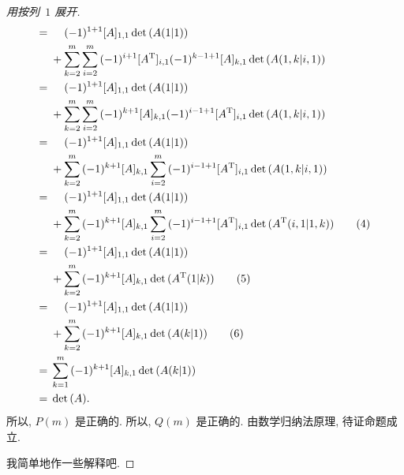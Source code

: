 \begin{proof}[用按列~\(1\) 展开]
\begin{align*}
        = {} &
        \hphantom{{} + {}}
        (-1)^{1+1} [A]_{1,1} \det {(A(1|1))}
        \\
             &
        + \sum_{k = 2}^{m} {
        \sum_{i = 2}^{m} {
        (-1)^{i+1} [A^{\mathrm{T}}]_{i,1}
        (-1)^{k-1+1} [A]_{k,1} \det {(A({1,k}|{i,1}))}
        }
        }
        \\
        = {} &
        \hphantom{{} + {}}
        (-1)^{1+1} [A]_{1,1} \det {(A(1|1))}
        \\
             &
        + \sum_{k = 2}^{m} {
        \sum_{i = 2}^{m} {
        (-1)^{k+1} [A]_{k,1}
        (-1)^{i-1+1} [A^{\mathrm{T}}]_{i,1}
        \det {(A({1,k}|{i,1}))}
        }
        }
        \\
        = {} &
        \hphantom{{} + {}}
        (-1)^{1+1} [A]_{1,1} \det {(A(1|1))}
        \\
             &
        + \sum_{k = 2}^{m} {
        (-1)^{k+1} [A]_{k,1}
        \sum_{i = 2}^{m} {
        (-1)^{i-1+1} [A^{\mathrm{T}}]_{i,1}
        \det {(A({1,k}|{i,1}))}
        }
        }
        \\
        = {} &
        \hphantom{{} + {}}
        (-1)^{1+1} [A]_{1,1} \det {(A(1|1))}
        \\
             &
        + \sum_{k = 2}^{m} {
        (-1)^{k+1} [A]_{k,1}
        \sum_{i = 2}^{m} {
        (-1)^{i-1+1} [A^{\mathrm{T}}]_{i,1}
        \det {(A^{\mathrm{T}} ({i,1}|{1,k}))}
        }
        }
        \tag*{(4)}
        \\
        = {} &
        \hphantom{{} + {}}
        (-1)^{1+1} [A]_{1,1} \det {(A(1|1))}
        \\
             &
        + \sum_{k = 2}^{m} {
        (-1)^{k+1} [A]_{k,1}
        \det {(A^{\mathrm{T}}(1|k))}
        }
        \tag*{(5)}
        \\
        = {} &
        \hphantom{{} + {}}
        (-1)^{1+1} [A]_{1,1} \det {(A(1|1))}
        \\
             &
        + \sum_{k = 2}^{m} {
        (-1)^{k+1} [A]_{k,1}
        \det {(A(k|1))}
        }
        \tag*{(6)}
        \\
        = {} &
        \sum_{k = 1}^{m} {
        (-1)^{k+1} [A]_{k,1}
        \det {(A(k|1))}
        }
        \\
        = {} &
        \det {(A)}.
    \end{align*}
    所以, \(P(m)\) 是正确的.
    所以, \(Q(m)\) 是正确的.
    由数学归纳法原理, 待证命题成立.

    我简单地作一些解释吧.


\end{proof}

